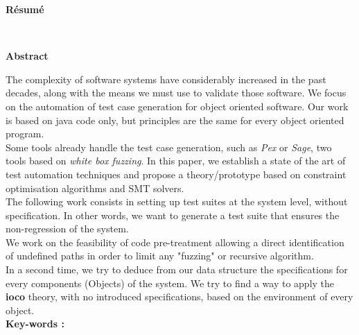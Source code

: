 \documentclass[a4paper]{report}
\begin{document}
\def\Abstract{
The complexity of software systems have considerably increased in the past decades, along with the means we must use to validate those software.
    We focus on the automation of test case generation for object oriented software. Our work is based on java code only, but principles are the same for every object oriented program.\\
    Some tools already handle the test case generation, such as \textit{Pex} or \textit{Sage}, two tools based on \textit{white box fuzzing}. In this paper, we establish a state of the art of test automation techniques and propose a theory/prototype based on constraint optimisation algorithms and SMT solvers.\\
    The following work consists in setting up test suites at the system level, without specification. 
In other words, we want to generate a test suite that ensures the non-regression of the system.\\
We work on the feasibility of code pre-treatment allowing a direct identification of undefined paths in order to limit any "fuzzing" or recursive algorithm.\\
In a second time, we try to deduce from our data structure the specifications for every components (Objects) of the system. We try to find a way to apply the \textbf{ioco} theory, with no introduced specifications, based on the environment of every object.
    \\[2mm]
    {\bf Key-words : } \keyWords
}


\thispagestyle{empty}
\begin{center}
\normalbaselineskip
{\bf\Large \TitreRapport}\\[8mm]
{\bf\large \NomsAuteurs}\\[1mm]
{\Labo}\\[4mm]
\DateRapport\\[4mm]
\Encadrants\\[10mm]

\newpage
{\bf R\'esum\'e}
\end{center}


\ResumeFrancais\\[4mm]
\newline
\begin{center}
{\bf Abstract}
\end{center}
\Abstract\\[4mm]



\tableofcontents

\renewcommand{\thesection}{\arabic{section}}
\end{document}
